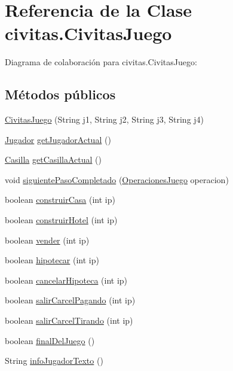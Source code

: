 \hypertarget{classcivitas_1_1CivitasJuego}{}\section{Referencia de la Clase civitas.\+Civitas\+Juego}
\label{classcivitas_1_1CivitasJuego}


Diagrama de colaboración para civitas.\+Civitas\+Juego\+:
\subsection*{Métodos públicos}
\begin{DoxyCompactItemize}
\item 
\hyperlink{classcivitas_1_1CivitasJuego_a4b26ce50375c0e4e4df6754c6f96fbbb}{Civitas\+Juego} (String j1, String j2, String j3, String j4)
\item 
\hyperlink{classcivitas_1_1Jugador}{Jugador} \hyperlink{classcivitas_1_1CivitasJuego_a5ddcdfd9eadc3ca5a1f9f139c57bc833}{get\+Jugador\+Actual} ()
\item 
\hyperlink{classcivitas_1_1Casilla}{Casilla} \hyperlink{classcivitas_1_1CivitasJuego_ac362b49d8a30d194dfb94c02dd808e1c}{get\+Casilla\+Actual} ()
\item 
void \hyperlink{classcivitas_1_1CivitasJuego_af55452b18c52846930fbcf1eef45d99a}{siguiente\+Paso\+Completado} (\hyperlink{enumcivitas_1_1OperacionesJuego}{Operaciones\+Juego} operacion)
\item 
boolean \hyperlink{classcivitas_1_1CivitasJuego_af8f7715fd9484a2744f784dfdbfb7259}{construir\+Casa} (int ip)
\item 
boolean \hyperlink{classcivitas_1_1CivitasJuego_ab22afced1a84c653073193eab94fceab}{construir\+Hotel} (int ip)
\item 
boolean \hyperlink{classcivitas_1_1CivitasJuego_a6ea7e8e9ad8411842dcc463ad4f4a707}{vender} (int ip)
\item 
boolean \hyperlink{classcivitas_1_1CivitasJuego_ad03c8d1b5a9b5553d586304f9b98b1bc}{hipotecar} (int ip)
\item 
boolean \hyperlink{classcivitas_1_1CivitasJuego_aa991dc2d67076fc05b84d28e69734ced}{cancelar\+Hipoteca} (int ip)
\item 
boolean \hyperlink{classcivitas_1_1CivitasJuego_a92689751fb840140186e0bdf1168a906}{salir\+Carcel\+Pagando} (int ip)
\item 
boolean \hyperlink{classcivitas_1_1CivitasJuego_a4490190bb9c0a51638d3867d67bb3693}{salir\+Carcel\+Tirando} (int ip)
\item 
boolean \hyperlink{classcivitas_1_1CivitasJuego_acd93386478ef23fee7cd1c4ca59c6acf}{final\+Del\+Juego} ()
\item 
String \hyperlink{classcivitas_1_1CivitasJuego_a83d2384c9f9a461637faa98ed00da8fd}{info\+Jugador\+Texto} ()
\end{DoxyCompactItemize}
